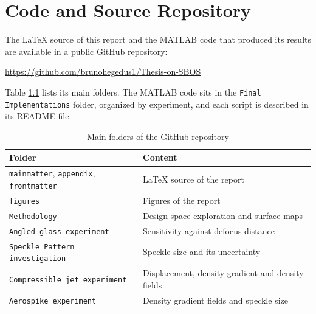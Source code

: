 \chapter{Code and Source Repository}
\label{Appendix: GitHub repository}

\par The LaTeX source of this report and the MATLAB code that produced its results are available in a public GitHub repository:

\begin{center}
    \url{https://github.com/brunohegedus1/Thesis-on-SBOS}
\end{center}

\par Table \ref{tab: repository structure} lists its main folders. The MATLAB code sits in the \texttt{Final Implementations} folder, organized by experiment, and each script is described in its README file.

\begin{table}[htbp]
    \centering
    \caption[Structure of the GitHub repository]{Main folders of the GitHub repository}
    \label{tab: repository structure}
    \begin{tabularx}{\textwidth}{@{}lX@{}}
        \toprule
        Folder & Content \\
        \midrule
        \texttt{mainmatter}, \texttt{appendix}, \texttt{frontmatter} & LaTeX source of the report \\
        \texttt{figures} & Figures of the report \\
        \texttt{Methodology} & Design space exploration and surface maps \\
        \texttt{Angled glass experiment} & Sensitivity against defocus distance \\
        \texttt{Speckle Pattern investigation} & Speckle size and its uncertainty \\
        \texttt{Compressible jet experiment} & Displacement, density gradient and density fields \\
        \texttt{Aerospike experiment} & Density gradient fields and speckle size \\
        \bottomrule
    \end{tabularx}
\end{table}
